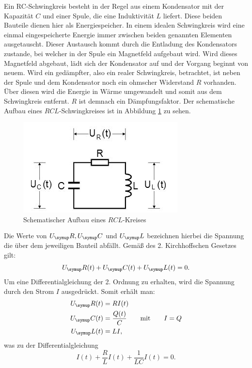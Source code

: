 Ein RC-Schwingkreis besteht in der Regel aus einem Kondensator mit der
Kapazität $C$ und einer Spule, die eine Induktivität $L$ liefert.
Diese beiden Bauteile dienen hier als Energiespeicher.
In einem idealen Schwingkreis wird eine einmal eingespeicherte Energie
immer zwischen beiden genannten Elementen ausgetauscht.
Dieser Austausch kommt durch die Entladung des Kondensators zustande, bei welcher
in der Spule ein Magnetfeld aufgebaut wird. Wird dieses Magnetfeld abgebaut,
lädt sich der Kondensator auf und der Vorgang beginnt von neuem.
Wird ein gedämpfter, also ein realer Schwingkreis, betrachtet, ist neben der
Spule und dem Kondensator noch ein ohmscher Widerstand $R$ vorhanden.
Über diesen wird die Energie in Wärme umgewandelt und somit aus dem
Schwingkreis entfernt. $R$ ist demnach ein Dämpfungsfaktor.
Der schematische Aufbau eines $RCL$-Schwingkreises ist in Abbildung \ref{fig:rcl}
zu sehen.
\begin{figure}[H]
  \centering
  \includegraphics{Bilder/RCL.JPG}
  \caption{Schematischer Aufbau eines $RCL$-Kreises\,\cite{354}}
  \label{fig:rcl}
\end{figure}
Die Werte von $U_\su{R}, U_\su{C}$ und $U_\su{L}$ bezeichnen hierbei die Spannung
die über dem jeweiligen Bauteil abfällt. Gemäß des 2. Kirchhoffschen Gesetzes
gilt:
\begin{equation}
  U_\su{R}(t) + U_\su{C}(t) + U_\su{L}(t) = 0.
  \label{eqn:kirch}
\end{equation}
Um eine Differentialgleichung der 2. Ordnung zu erhalten, wird die Spannung
durch den Strom $I$ ausgedrückt. Somit erhält man:
\begin{align*}
  U_\su{R}(t) &= RI(t) \\
  U_\su{C}(t) &= \frac{Q(t)}{C} \qquad \text{mit} \qquad I = Q \\
  U_\su{L}(t) &= LI ,
\end{align*}
was zu der Differentialgleichung
\begin{equation}
  I(t) + \frac{R}{L}I(t) + \frac{1}{LC} I(t) = 0 .
\end{equation}
